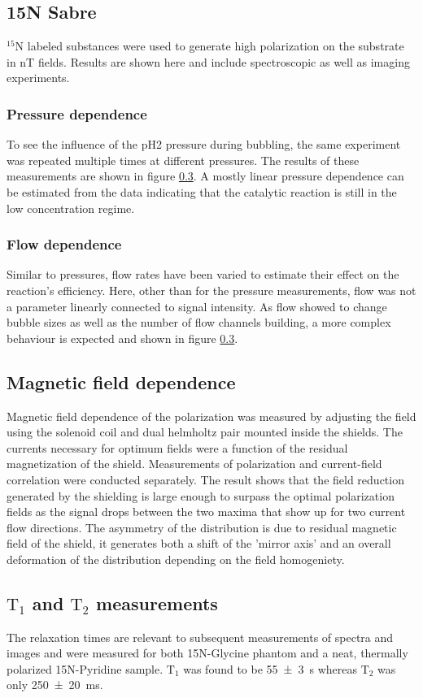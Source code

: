     \subsection{15N Sabre}
        $^{15}\mathrm{N}$ labeled substances were used to generate high polarization on the substrate in \si{\nano\tesla} fields. Results are shown here and include spectroscopic as well as imaging experiments.
    \subsubsection{Pressure dependence}
        To see the influence of the pH2 pressure during bubbling, the same experiment was repeated multiple times at different pressures. The results of these measurements are shown in figure \ref{}. A mostly linear pressure dependence can be estimated from the data indicating that the catalytic reaction is still in the low concentration regime.
    \subsubsection{Flow dependence}
        Similar to pressures, flow rates have been varied to estimate their effect on the reaction's efficiency. Here, other than for the pressure measurements, flow was not a parameter linearly connected to signal intensity. As flow showed to change bubble sizes as well as the number of flow channels building, a more complex behaviour is expected and shown in figure \ref{}.
    \subsection{Magnetic field dependence}
        Magnetic field dependence of the polarization was measured by adjusting the field using the solenoid coil and dual helmholtz pair mounted inside the shields. The currents necessary for optimum fields were a function of the residual magnetization of the shield. Measurements of polarization and current-field correlation were conducted separately. The result shows that the field reduction generated by the shielding is large enough to surpass the optimal polarization fields as the signal drops between the two maxima that show up for two current flow directions. The asymmetry of the distribution is due to residual magnetic field of the shield, it generates both a shift of the 'mirror axis' and an overall deformation of the distribution depending on the field homogeniety.
    \subsection{$\mathrm{T_1}$ and $\mathrm{T_2}$ measurements}
        The relaxation times are relevant to subsequent measurements of spectra and images and were measured for both 15N-Glycine phantom and a neat, thermally polarized 15N-Pyridine sample. $\mathrm{T}_1$ was found to be \SI{55\pm 3}{\second} whereas $\mathrm{T}_2$ was only \SI{250\pm 20}{\milli\second}.
